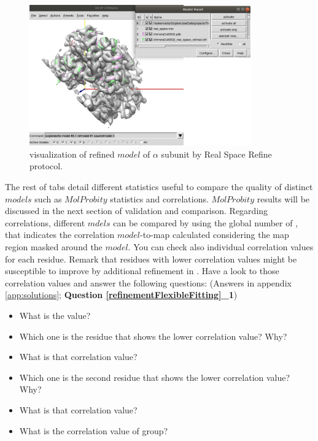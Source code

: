  \begin{figure}[H]
  \centering 
  \captionsetup{width=.7\linewidth} 
  \includegraphics[width=0.85\textwidth]{Images/Fig30}
  \caption{\chimera visualization of refined $model$ of  $\alpha$ subunit by \phenix Real Space Refine protocol.}
  \label{fig:phenix_real_space_refine_chimera}
  \end{figure}
  
  The rest of tabs detail different statistics useful to compare the quality of distinct $models$ such as $MolProbity$ statistics and  correlations. $MolProbity$ results will be discussed in the next section of validation and comparison. Regarding  correlations, different $mdels$ can be compared by using the global number of \ccmask, that indicates the correlation $model$-to-map calculated considering the map region masked around the $model$. You can check also individual correlation values for each residue.  Remark that residues with lower correlation values might be susceptible to improve by additional refinement in \coot. Have a look to those correlation values and answer the following questions: (Answers in appendix \ref{app:solutions}; \textbf{Question \ref{refinementFlexibleFitting}\_1}) \\
  
  \begin{minipage}{\linewidth}
  \begin{framed}
  \begin{itemize}
  \item What is the \ccmask value?
  \item Which one is the residue that shows the lower correlation value? Why?
  \item What is that correlation value?
  \item Which one is the second residue that shows the lower correlation value? Why?
  \item What is that correlation value?
  \item What is the correlation value of  group?
  \end{itemize}
  \end{framed}
  \end{minipage}\\
  
